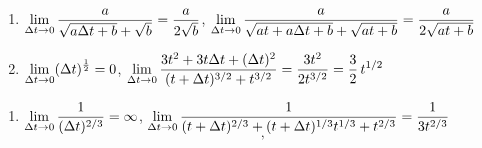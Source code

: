 \begin{enumerate}
\setcounter{enumi}{\value{HW}}

\item   $\displaystyle{ \lim_{\Delta t \rightarrow 0} \dfrac{a}{\sqrt{a\Delta t+b} + \sqrt{b}}  =  \dfrac{a}{2 \sqrt{b}}}$,   $\displaystyle{ \lim_{\Delta t \rightarrow 0} \dfrac{a}{\sqrt{at+a\Delta t+b} + \sqrt{at+b}} = \dfrac{a}{2 \sqrt{at+b}} }$  
\item   $\displaystyle{ \lim_{\Delta t \rightarrow 0} (\Delta t)^{\frac{1}{2}}   =  0}$,   $\displaystyle{ \lim_{\Delta t \rightarrow 0}\dfrac{3t^2+3t\Delta t+(\Delta t)^2}{(t+\Delta t)^{3/2} + t^{3/2}} = \dfrac{3t^2}{2 t^{3/2}} = \dfrac{3}{2} \, t^{1/2} }$    

\setcounter{HW}{\value{enumi}}
\end{enumerate}


\begin{enumerate}
\setcounter{enumi}{\value{HW}}

\item  $\displaystyle{ \lim_{\Delta t \rightarrow 0} \dfrac{1}{(\Delta t)^{2/3}}   =  \infty}$,   $\displaystyle{ \lim_{\Delta t \rightarrow 0} \dfrac{1}{(t+\Delta t)^{2/3} + (t+\Delta t)^{1/3} t^{1/3} + t^{2/3}} = \dfrac{1}{3 t^{2/3}} }$     $$,  $$

\setcounter{HW}{\value{enumi}}
\end{enumerate}

